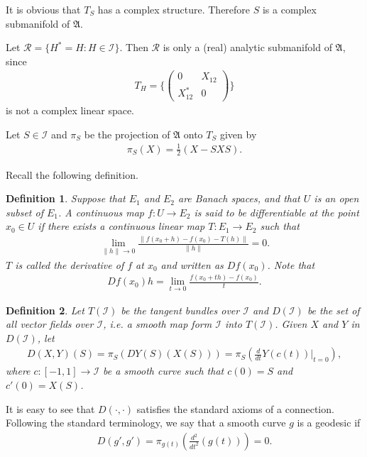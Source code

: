 \documentclass[a4paper,10pt]{amsart}
\newtheorem{definition}{Definition}[section]
\newcommand{\AAA}{\mathfrak A}
\newcommand{\I}{\mathcal I}
\begin{document}
It is obvious that $T_{S}$ has a complex structure. Therefore $S$ is a
complex submanifold of $\AAA$. 

Let $\mathcal{R} = \{H^{*} = H : H \in \mathcal{I} \}$. Then 
$\mathcal{R}$ is only a (real) analytic submanifold of $\AAA$,
since 
\begin{align*}
    T_{H} = \{
        \begin{pmatrix}
            0 & X_{12}\\
            X_{12}^{*} & 0
    \end{pmatrix} \}
\end{align*}
is not a complex linear space.

Let $S \in \mathcal{I}$ and $\pi_{S}$ be the projection of $\AAA$ onto
$T_S$ given by
\begin{align*}
    \pi_{S}(X) = \frac{1}{2}(X -SXS).
\end{align*}

Recall the following definition.

\begin{definition}
   Suppose that $E_1$ and $E_2$ are Banach spaces, and that $U$ is an
   open subset of $E_1$. A continuous map $f: U \rightarrow E_2$ is said
   to be differentiable at the point $x_0 \in U$ if there exists a 
   continuous linear map $T: E_1 \rightarrow E_2$ such that 
   \begin{align*}
       \lim_{\|h\| \rightarrow 0} \frac{\| f(x_0 +h) -f(x_0) - T(h)\|}
       {\|h\|} = 0.
   \end{align*}
   $T$ is called the derivative of $f$ at $x_0$ and written as
   $Df(x_0)$. Note that
   \begin{align*}
       Df(x_0)h = \lim_{t \rightarrow 0} \frac{f(x_0 + th) - f(x_0)}{t}. 
   \end{align*}
\end{definition}

\begin{definition}
    Let $T(\I)$ be the tangent bundles over $\I$ and $D(\I)$ be the set of 
    all vector fields over $\I$, i.e. a smooth map form $\I$ into $T(\I)$.
    Given $X$ and $Y$ in $D(\I)$, let  
    \begin{align*}
        D(X,Y)(S) = \pi_{S}(DY(S) (X(S))) 
        = \pi_{S}(\frac{d}{dt}Y(c(t))|_{t=0}), 
    \end{align*}
    where $c: [-1,1] \rightarrow \I$ be a smooth curve such that $c(0) = S$
    and $c'(0) = X(S)$.
\end{definition}

It is easy to see that $D(\cdot, \cdot)$ satisfies the standard axioms of 
a connection. Following the standard terminology, we say that a smooth
curve $g$ is a geodesic if
\begin{align*}
    D(g', g') = \pi_{g(t)}(\frac{d^{2}}{dt^{2}} (g(t))) = 0. 
\end{align*}
\end{document}
